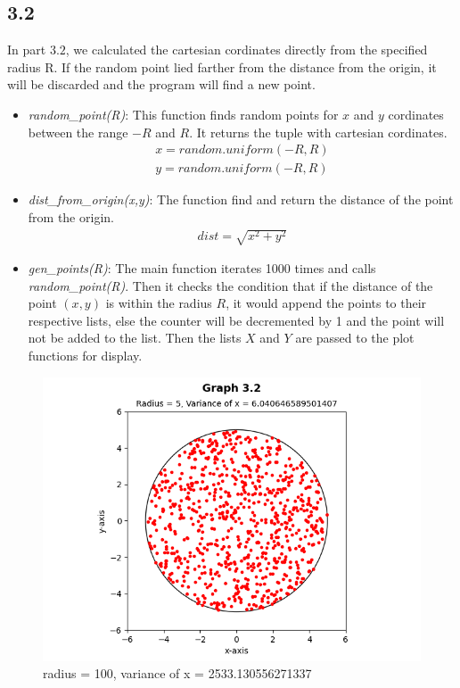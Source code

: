 \documentclass[answers]{exam}
\begin{document}
\subsection*{3.2}
\begin{framed}
  \indent In part $3.2$, we calculated the cartesian cordinates directly from the specified radius R. If the random point lied farther from the distance from the origin, it will be discarded and the program will find a new point.
  \begin{itemize}
    \item \emph{random\_point(R)}: This function finds random points for $x$ and $y$ cordinates between the range $-R$ and $R$. It returns the tuple with cartesian cordinates.\\
      \begin{align*}
        x=random.uniform(-R,R)\\
        y=random.uniform(-R,R)
      \end{align*}
    \item \emph{dist\_from\_origin(x,y)}: The function find and return the distance of the point from the origin.\\
      \begin{align*}
        dist=\sqrt{x^2+y^2}
      \end{align*}
    \item \emph{gen\_points(R)}: The main function iterates 1000 times and calls \emph{random\_point(R)}. Then it checks the condition that if the distance of the point $(x,y)$ is within the radius $R$, it would append the points to their respective lists, else the counter will be decremented by 1 and the point will not be added to the list. Then the lists $X$ and $Y$ are passed to the plot functions for display.
  \end{itemize}
\end{framed}

\begin{figure}[h]
  \caption{radius = 100, variance of x = 2533.130556271337}
  \centering
  \includegraphics[scale=0.7]{Q3/Q3(2).png}
\end{figure}
\end{document}
